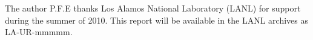 \documentclass[preprint,12pt]{elsarticle}
\begin{document}
The author P.F.E thanks Los Alamos National Laboratory (LANL) for support during the summer of 2010. This report will be available in the LANL archives as LA-UR-mmmmm.




\end{document}
